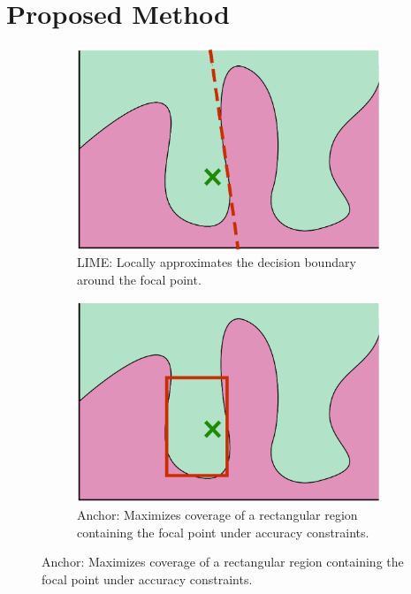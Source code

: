 \documentclass[runningheads]{llncs}
\begin{document}
\section{Proposed Method}
\begin{figure}[tbp]
	\centering
	\begin{subfigure}[t]{0.3\textwidth}
		\centering
		\includegraphics[width=\textwidth]{visual-lime}
		\caption{%
			LIME: Locally approximates the decision boundary around the focal point.
		}\label{fig:lime}
	\end{subfigure}%
	\hspace{0.03\textwidth}
	\begin{subfigure}[t]{0.3\textwidth}
		\centering
		\includegraphics[width=\textwidth]{visual-anchor}
		\caption{%
			Anchor: Maximizes coverage of a rectangular region
			containing the focal point under accuracy constraints.
		}\label{fig:anchor}
	\end{subfigure}

\end{figure}
\end{document}

